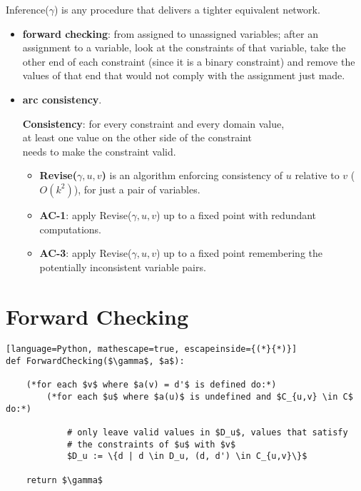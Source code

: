 \documentclass{article}
\begin{document}
Inference($\gamma$) is any procedure that delivers a tighter equivalent network.
\begin{itemize}
    \item \textbf{forward checking}: from assigned to unassigned variables; after an assignment to a variable, look at the constraints of that variable, take the other end of each constraint (since it is a binary constraint) and remove the values of that end that would not comply with the assignment just made.
    \item \textbf{arc consistency}. \\
    \begin{center}
        \textbf{Consistency}: for every constraint and every domain value, \\ at least one value on the other side of the constraint \\ needs to make the constraint valid.
    \end{center}
    \begin{itemize}
        \item \textbf{Revise($\gamma, u, v$)} is an algorithm enforcing consistency of $u$ relative to $v$ ($O(k^2)$), for just a pair of variables.
        \item \textbf{AC-1}: apply Revise($\gamma, u, v$) up to a fixed point with redundant computations.
        \item \textbf{AC-3}: apply Revise($\gamma, u, v$) up to a fixed point remembering the potentially inconsistent variable pairs.
    \end{itemize}
\end{itemize}

\newpage

\section*{Forward Checking}
\begin{lstlisting}[language=Python, mathescape=true, escapeinside={(*}{*)}]
def ForwardChecking($\gamma$, $a$):

    (*for each $v$ where $a(v) = d'$ is defined do:*)
        (*for each $u$ where $a(u)$ is undefined and $C_{u,v} \in C$ do:*)
        
            # only leave valid values in $D_u$, values that satisfy 
            # the constraints of $u$ with $v$
            $D_u := \{d | d \in D_u, (d, d') \in C_{u,v}\}$

    return $\gamma$

\end{lstlisting}
\end{document}
